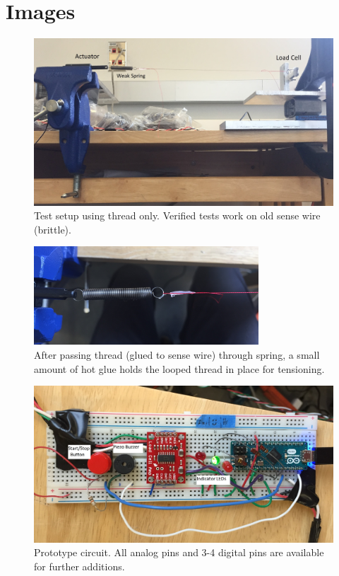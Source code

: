 \documentclass[letterpaper,12pt]{article}
\begin{document}
\section*{Images}
\begin{figure} [h]
		\centering
		\includegraphics[width=\textwidth]{setup_side.jpg}
		\caption{Test setup using thread only. Verified tests work on old sense wire (brittle).}
		\label{fig:side}
\end{figure}
\begin{figure}[!h]
	\centering
	\includegraphics[width=0.75\textwidth]{thread_glue.jpg}
	\caption{After passing thread (glued to sense wire) through spring, a small amount of hot glue holds the looped thread in place for tensioning.}
	\label{fig:glue}
\end{figure}
\begin{figure}[h]
	\centering
	\includegraphics[width=\textwidth]{circuit_top.jpg}
	\caption{Prototype circuit. All analog pins and 3-4 digital pins are available for further additions.}
	\label{fig:circuit}
\end{figure}
\end{document}
